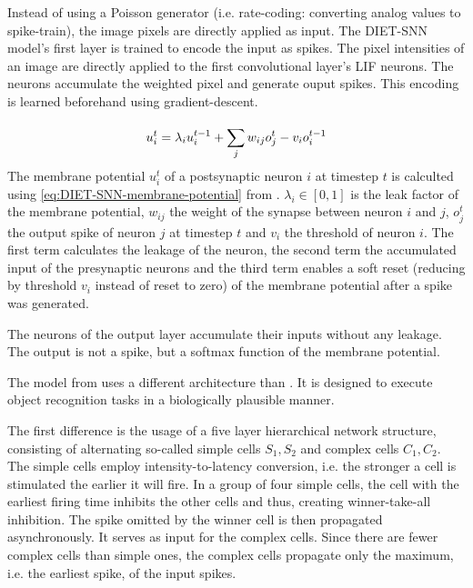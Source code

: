 Instead of using a Poisson generator (i.e. rate-coding: converting analog values to spike-train), the image pixels are directly applied as input.
The \ac{DIET}-\ac{SNN} model's first layer is trained to encode the input as spikes.
The pixel intensities of an image are directly applied to the first convolutional layer's \ac{LIF} neurons.
The neurons accumulate the weighted pixel and generate ouput spikes.
This encoding is learned beforehand using gradient-descent.

\begin{equation}
    \centering
    \label{eq:DIET-SNN-membrane-potential}
    u_i^t = \lambda_i u_i^{t-1} + \sum_{j}^{}w_{ij}o_j^t-v_{i}o_i^{t-1}
\end{equation}
%
The membrane potential $u_i^t$ of a postsynaptic neuron $i$ at timestep $t$ 
is calculted using \autoref{eq:DIET-SNN-membrane-potential} from \cite{DIET_SNN}. 
$\lambda_i \in [0,1]$ is the leak factor of the membrane potential, 
$w_{ij}$ the weight of the synapse between neuron $i$ and $j$, 
$o_j^t$ the output spike of neuron $j$ at timestep $t$ and 
$v_i$ the threshold of neuron $i$.
The first term calculates the leakage of the neuron,
the second term the accumulated input of the presynaptic neurons and
the third term enables a soft reset (reducing by threshold $v_i$ instead of reset to zero) of the membrane potential after a spike was generated.

The neurons of the output layer accumulate their inputs without any leakage.
The output is not a spike, but a softmax function of the membrane potential.

The model from \cite{multi_scale_STDP} uses a different architecture than \cite{SNN}.
It is designed to execute object recognition tasks in a biologically plausible manner.

The first difference is the usage of a five layer hierarchical network structure, consisting of alternating so-called simple cells $S_1, S_2$ and complex cells $C_1, C_2$.
The simple cells employ intensity-to-latency conversion, i.e. the stronger a cell is stimulated the earlier it will fire.
In a group of four simple cells, the cell with the earliest firing time inhibits the other cells and thus, creating winner-take-all inhibition.
The spike omitted by the winner cell is then propagated asynchronously.
It serves as input for the complex cells.
Since there are fewer complex cells than simple ones, the complex cells propagate only the maximum, i.e. the earliest spike, of the input spikes.


